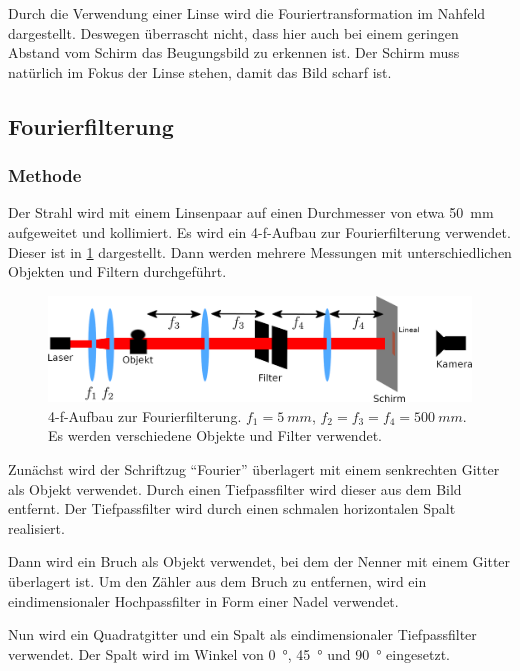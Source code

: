 \documentclass[
	a4paper,
	12pt,
	pagesize,
	ngerman
]{scrartcl}
\begin{document}
Durch die Verwendung einer Linse wird die Fouriertransformation im Nahfeld dargestellt. %
Deswegen überrascht nicht, dass hier auch bei einem geringen Abstand vom Schirm das Beugungsbild zu erkennen ist.
Der Schirm muss natürlich im Fokus der Linse stehen, damit das Bild scharf ist.


	\subsection{Fourierfilterung}

	\subsubsection*{Methode}

		Der Strahl wird mit einem Linsenpaar auf einen Durchmesser von etwa \SI{50}{mm} aufgeweitet und kollimiert.
		Es wird ein 4-f-Aufbau zur Fourierfilterung verwendet.
		Dieser ist in \cref{fig_4f} dargestellt.
		Dann werden mehrere Messungen mit unterschiedlichen Objekten und Filtern durchgeführt.

	\begin{figure}[H]
			\includegraphics[width=1\linewidth]{img/4f}
			\caption{
				4-f-Aufbau zur Fourierfilterung. $f_1= \SI{5}{mm}$, $f_2 = f_3 = f_4 = \SI{500}{mm}$. Es werden verschiedene Objekte und Filter verwendet.
			}
			\label{fig_4f}
	\end{figure}


		Zunächst wird der Schriftzug \enquote{Fourier} überlagert mit einem senkrechten Gitter als Objekt verwendet.
		Durch einen Tiefpassfilter wird dieser aus dem Bild entfernt.
		Der Tiefpassfilter wird durch einen schmalen horizontalen Spalt realisiert.

		Dann wird ein Bruch als Objekt verwendet, bei dem der Nenner mit einem Gitter überlagert ist.
		Um den Zähler aus dem Bruch zu entfernen, wird ein eindimensionaler Hochpassfilter in Form einer Nadel verwendet.

		Nun wird ein Quadratgitter und ein Spalt als eindimensionaler Tiefpassfilter verwendet.
		Der Spalt wird im Winkel von \SI{0}{\degree}, \SI{45}{\degree} und \SI{90}{\degree} eingesetzt.
\end{document}
